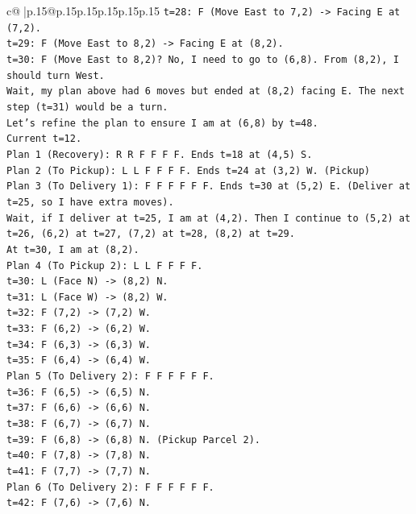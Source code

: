 \documentclass{article}
\begin{document}
{\begin{supertabular}{c@{$\;$}|p{.15\linewidth}@{}p{.15\linewidth}p{.15\linewidth}p{.15\linewidth}p{.15\linewidth}p{.15\linewidth}}
{{{\texttt{t=28: F (Move East to 7,2) {-}> Facing E at (7,2).} \\
\texttt{t=29: F (Move East to 8,2) {-}> Facing E at (8,2).} \\
\texttt{t=30: F (Move East to 8,2)? No, I need to go to (6,8). From (8,2), I should turn West.} \\
\texttt{Wait, my plan above had 6 moves but ended at (8,2) facing E. The next step (t=31) would be a turn.} \\
\texttt{Let's refine the plan to ensure I am at (6,8) by t=48.} \\
\texttt{Current t=12.} \\
\texttt{Plan 1 (Recovery): R R F F F F. Ends t=18 at (4,5) S.} \\
\texttt{Plan 2 (To Pickup): L L F F F F. Ends t=24 at (3,2) W. (Pickup)} \\
\texttt{Plan 3 (To Delivery 1): F F F F F F. Ends t=30 at (5,2) E. (Deliver at t=25, so I have extra moves).} \\
\texttt{Wait, if I deliver at t=25, I am at (4,2). Then I continue to (5,2) at t=26, (6,2) at t=27, (7,2) at t=28, (8,2) at t=29.} \\
\texttt{At t=30, I am at (8,2).} \\
\texttt{Plan 4 (To Pickup 2): L L F F F F.} \\
\texttt{t=30: L (Face N) {-}> (8,2) N.} \\
\texttt{t=31: L (Face W) {-}> (8,2) W.} \\
\texttt{t=32: F (7,2) {-}> (7,2) W.} \\
\texttt{t=33: F (6,2) {-}> (6,2) W.} \\
\texttt{t=34: F (6,3) {-}> (6,3) W.} \\
\texttt{t=35: F (6,4) {-}> (6,4) W.} \\
\texttt{Plan 5 (To Delivery 2): F F F F F F.} \\
\texttt{t=36: F (6,5) {-}> (6,5) N.} \\
\texttt{t=37: F (6,6) {-}> (6,6) N.} \\
\texttt{t=38: F (6,7) {-}> (6,7) N.} \\
\texttt{t=39: F (6,8) {-}> (6,8) N. (Pickup Parcel 2).} \\
\texttt{t=40: F (7,8) {-}> (7,8) N.} \\
\texttt{t=41: F (7,7) {-}> (7,7) N.} \\
\texttt{Plan 6 (To Delivery 2): F F F F F F.} \\
\texttt{t=42: F (7,6) {-}> (7,6) N.} \\
}}}
\end{supertabular}}
\end{document}
